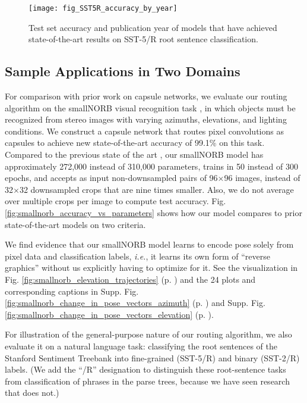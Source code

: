 \documentclass[11pt,a4paper]{article}
\begin{document}
\begin{figure}[t]
	\vskip 0.1in
	\begin{center}
		\centerline{\texttt{[image: fig\_SST5R\_accuracy\_by\_year]}}
		\caption{Test set accuracy and publication year of models that have achieved state-of-the-art results on SST-5/R root sentence classification.}
		\label{fig:SST5R_accuracy_by_year}
	\end{center}
	\vskip -0.2in
\end{figure} 

\subsection*{Sample Applications in Two Domains}


For comparison with prior work on capsule networks, we evaluate our routing algorithm on the smallNORB visual recognition task \cite{LeCun:2004:LMG:1896300.1896315}, in which objects must be recognized from stereo images with varying azimuths, elevations, and lighting conditions. We construct a capsule network that routes pixel convolutions as capsules to achieve new state-of-the-art accuracy of 99.1\% on this task. Compared to the previous state of the art \cite{46653}, our smallNORB model has approximately 272,000 instead of 310,000 parameters, trains in 50 instead of 300 epochs, and accepts as input non-downsampled pairs of 96$\times$96 images, instead of 32$\times$32 downsampled crops that are nine times smaller. Also, we do not average over multiple crops per image to compute test accuracy. Fig. \ref{fig:smallnorb_accuracy_vs_parameters} shows how our model compares to prior state-of-the-art models on two criteria.

We find evidence that our smallNORB model learns to encode pose solely from pixel data and classification labels, {\em i.e.}, it learns its own form of ``reverse graphics'' without us explicitly having to optimize for it. See the visualization in Fig. \ref{fig:smallnorb_elevation_trajectories} (p. \pageref{fig:smallnorb_elevation_trajectories}) and the 24 plots and corresponding captions in Supp. Fig. \ref{fig:smallnorb_change_in_pose_vectors_azimuth} (p. \pageref{fig:smallnorb_change_in_pose_vectors_azimuth}) and Supp. Fig. \ref{fig:smallnorb_change_in_pose_vectors_elevation} (p. \pageref{fig:smallnorb_change_in_pose_vectors_elevation}).

For illustration of the general-purpose nature of our routing algorithm, we also evaluate it on a natural language task: classifying the root sentences of the Stanford Sentiment Treebank \cite{brusilovsky:socher2013recursive} into fine-grained (SST-5/R) and binary (SST-2/R) labels. (We add the ``/R'' designation to distinguish these root-sentence tasks from classification of phrases in the parse trees, because we have seen research that does not.)
\end{document}
